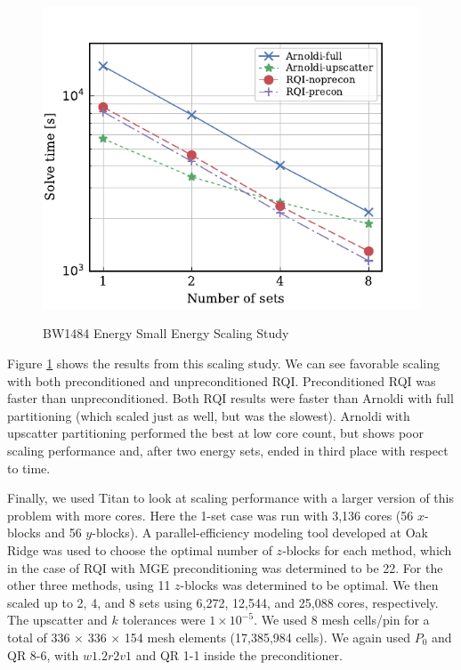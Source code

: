 \documentclass{article}                                                                           %
\begin{document}
\begin{figure}
\caption{BW1484 Energy Small Energy Scaling Study}
\includegraphics[scale=1]{./bw1484-small-cades-timing.pdf}
\label{fig:small}
\centering
\end{figure}
%
Figure \ref{fig:small} shows the results from this scaling study. We can see favorable scaling with both preconditioned and unpreconditioned RQI. Preconditioned RQI was faster than unpreconditioned. Both RQI results were faster than Arnoldi with full partitioning (which scaled just as well, but was the slowest). Arnoldi with upscatter partitioning performed the best at low core count, but shows poor scaling performance and, after two energy sets, ended in third place with respect to time. 

Finally, we used Titan to look at scaling performance with a larger version of this problem with more cores. Here the 1-set case was run with 3,136 cores (56 $x$-blocks and 56 $y$-blocks). A parallel-efficiency modeling tool developed at Oak Ridge was used to choose the optimal number of $z$-blocks for each method, which in the case of RQI with MGE preconditioning was determined to be 22. For the other three methods, using 11 $z$-blocks was determined to be optimal. We then scaled up to 2, 4, and 8 sets using 6,272, 12,544, and 25,088 cores, respectively. The upscatter and $k$ tolerances were $1 \times 10^{-5}$. We used 8 mesh cells/pin for a total of 336 $\times$ 336 $\times$ 154 mesh elements (17,385,984 cells). We again used $P_0$ and QR 8-6, with $w1.2r2v1$ and QR 1-1 inside the preconditioner.
\end{document}
